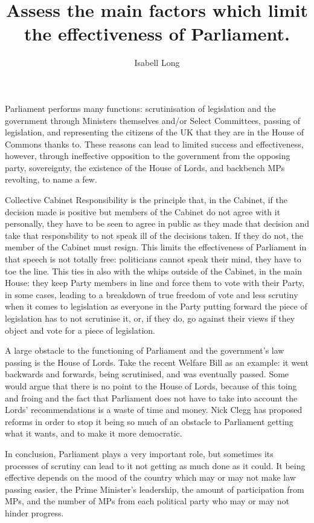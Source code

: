\documentclass[12pt,a4paper]{article}
\begin{document}
\title{Assess the main factors which limit the effectiveness of Parliament.}
\author{Isabell Long}
\maketitle

Parliament performs many functions: scrutinisation of legislation and the government through Ministers themselves and\slash or Select Committees, passing of legislation, and representing the citizens of the UK that they are in the House of Commons thanks to.  These reasons can lead to limited success and effectiveness, however, through ineffective opposition to the government from the opposing party, sovereignty, the existence of the House of Lords, and backbench MPs revolting, to name a few.

Collective Cabinet Responsibility is the principle that, in the Cabinet, if the decision made is positive but members of the Cabinet do not agree with it personally, they have to be seen to agree in public as they made that decision and take that responsbility to not speak ill of the decisions taken.  If they do not, the member of the Cabinet must resign.  This limits the effectiveness of Parliament in that speech is not totally free: politicians cannot speak their mind, they have to toe the line.  This ties in also with the whips outside of the Cabinet, in the main House: they keep Party members in line and force them to vote with their Party, in some cases, leading to a breakdown of true freedom of vote and less scrutiny when it comes to legislation as everyone in the Party putting forward the piece of legislation has to not scrutinise it, or, if they do, go against their views if they object and vote for a piece of legislation.

A large obstacle to the functioning of Parliament and the government's law passing is the House of Lords.  Take the recent Welfare Bill as an example: it went backwards and forwards, being scrutinised, and was eventually passed.  Some would argue that there is no point to the House of Lords, because of this toing and froing and the fact that Parliament does not have to take into account the Lords' recommendations is a waste of time and money.  Nick Clegg has proposed reforms in order to stop it being so much of an obstacle to Parliament getting what it wants, and to make it more democratic.

In conclusion, Parliament plays a very important role, but sometimes its processes of scrutiny can lead to it not getting as much done as it could.  It being effective depends on the mood of the country which may or may not make law passing easier, the Prime Minister's leadership, the amount of participation from MPs, and the number of MPs from each political party who may or may not hinder progress.
\end{document}
